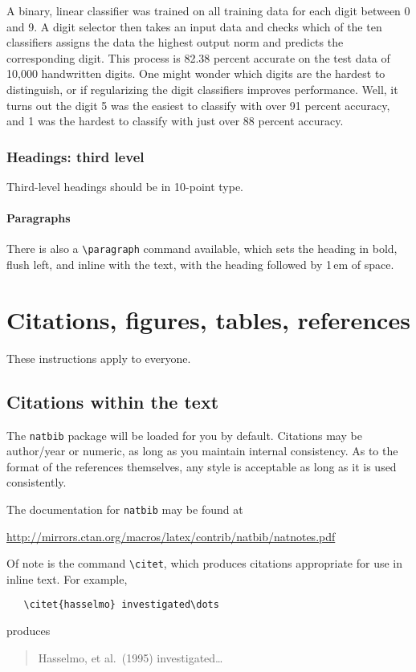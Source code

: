 \documentclass{article}
\begin{document}
A binary, linear classifier was trained on all training data for each digit between 0 and 9. A digit selector then takes an input data and checks which of the ten classifiers assigns the data the highest output norm and predicts the corresponding digit. This process is 82.38 percent accurate on the test data of 10,000 handwritten digits. One might wonder which digits are the hardest to distinguish, or if regularizing the digit classifiers improves performance. Well, it turns out the digit 5 was the easiest to classify with over 91 percent accuracy, and 1 was the hardest to classify with just over 88 percent accuracy.

\subsubsection{Headings: third level}

Third-level headings should be in 10-point type.

\paragraph{Paragraphs}

There is also a \verb+\paragraph+ command available, which sets the heading in
bold, flush left, and inline with the text, with the heading followed by 1\,em
of space.

\section{Citations, figures, tables, references}
\label{others}

These instructions apply to everyone.

\subsection{Citations within the text}

The \verb+natbib+ package will be loaded for you by default.  Citations may be
author/year or numeric, as long as you maintain internal consistency.  As to the
format of the references themselves, any style is acceptable as long as it is
used consistently.

The documentation for \verb+natbib+ may be found at
\begin{center}
  \url{http://mirrors.ctan.org/macros/latex/contrib/natbib/natnotes.pdf}
\end{center}
Of note is the command \verb+\citet+, which produces citations appropriate for
use in inline text.  For example,
\begin{verbatim}
   \citet{hasselmo} investigated\dots
\end{verbatim}
produces
\begin{quote}
  Hasselmo, et al.\ (1995) investigated\dots
\end{quote}
\end{document}
